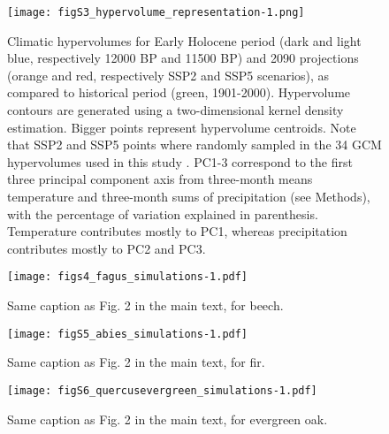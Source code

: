 \documentclass[pdflatex, sn-nature, oneside]{sn-jnl}%
\begin{document}
\begin{figure}
\hspace*{-0.75in}
\centering
\texttt{[image: figS3\_hypervolume\_representation-1.png]}
\caption{Climatic hypervolumes for Early Holocene period (dark and light blue, respectively 12000 BP and 11500 BP) and 2090 projections (orange and red, respectively SSP2 and SSP5 scenarios), as compared to historical period (green, 1901-2000). Hypervolume contours are generated using a two-dimensional kernel density estimation. Bigger points represent hypervolume centroids. Note that SSP2 and SSP5 points where randomly sampled in the 34 GCM hypervolumes used in this study  \cite{Thrasher2022}. PC1-3 correspond to the first three principal component axis from three-month means temperature and three-month sums of precipitation (see Methods), with the percentage of variation explained in parenthesis. Temperature contributes mostly to PC1, whereas precipitation contributes mostly to PC2 and PC3.}
\end{figure}


\begin{figure}
\hspace*{-0.3in}
\centering
\texttt{[image: figs4\_fagus\_simulations-1.pdf]}
\caption{Same caption as Fig. 2 in the main text, for beech.}
\end{figure}

\begin{figure}
\hspace*{-.3in}
\centering
\texttt{[image: figS5\_abies\_simulations-1.pdf]}
\caption{Same caption as Fig. 2 in the main text, for fir.}
\end{figure}

\begin{figure}
\hspace*{-.3in}
\centering
\texttt{[image: figS6\_quercusevergreen\_simulations-1.pdf]}
\caption{Same caption as Fig. 2 in the main text, for evergreen oak.}
\end{figure}
\end{document}

